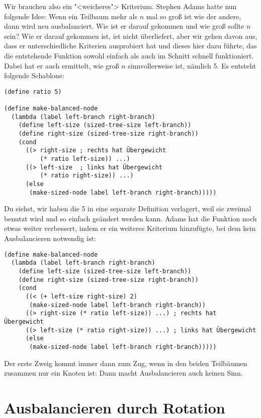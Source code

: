 Wir brauchen also ein "<weicheres"> Kriterium.  Stephen Adams hatte
nun folgende Idee: Wenn ein Teilbaum mehr als $n$ mal so groß ist wie
der andere, dann wird neu ausbalanciert.  Wie ist er darauf gekommen
und wie groß sollte $n$ sein?  Wie er darauf gekommen ist, ist
nicht überliefert, aber wir gehen davon aus, dass er unterschiedliche
Kriterien ausprobiert hat und dieses hier dazu führte, das die
entstehende Funktion sowohl einfach als auch im Schnitt schnell
funktioniert.  Dabei hat er auch ermittelt, wie groß $n$
sinnvollerweise ist, nämlich 5.  Es entsteht folgende Schablone:\label{def:ratio}
%
\begin{lstlisting}
(define ratio 5)

(define make-balanced-node
  (lambda (label left-branch right-branch)
    (define left-size (sized-tree-size left-branch))
    (define right-size (sized-tree-size right-branch))
    (cond
      ((> right-size ; rechts hat Übergewicht
          (* ratio left-size)) ...) 
      ((> left-size  ; links hat Übergewicht
          (* ratio right-size)) ...)
      (else
       (make-sized-node label left-branch right-branch)))))
\end{lstlisting}
%
Du siehst, wir haben die 5 in eine separate Definition verlagert, weil
sie zweimal benutzt wird und so einfach geändert werden kann.  Adams
hat die Funktion noch etwas weiter verbessert, indem er ein weiteres
Kriterium hinzufügte, bei dem kein Ausbalancieren notwendig ist:

\begin{lstlisting}
(define make-balanced-node
  (lambda (label left-branch right-branch)
    (define left-size (sized-tree-size left-branch))
    (define right-size (sized-tree-size right-branch))
    (cond
      ((< (+ left-size right-size) 2)
       (make-sized-node label left-branch right-branch))
      ((> right-size (* ratio left-size)) ...) ; rechts hat Übergewicht
      ((> left-size (* ratio right-size)) ...) ; links hat Übergewicht
      (else
       (make-sized-node label left-branch right-branch)))))
\end{lstlisting}
%
Der erste Zweig kommt immer dann zum Zug, wenn in den beiden
Teilbäumen zusammen nur ein Knoten ist: Dann macht Ausbalancieren auch
keinen Sinn.

\section{Ausbalancieren durch Rotation}

